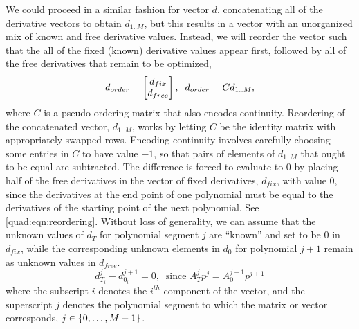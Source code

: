 We could proceed in a similar fashion for vector $d$, concatenating all of the derivative vectors to obtain $d_{1..M}$, but this results in a vector with an unorganized mix of known and free derivative values. Instead, we will reorder the vector such that the all of the fixed (known) derivative values appear first, followed by all of the free derivatives that remain to be optimized,
\begin{equation}
    d_{order} = \begin{bmatrix}
                    d_{fix} \\
                    d_{free}
                \end{bmatrix}
                , \hspace{2mm} d_{order} = Cd_{1..M},
\label{quad:eqn:ordering}
\end{equation}
where $C$ is a pseudo-ordering matrix that also encodes continuity. Reordering of the concatenated vector, $d_{1..M}$, works by letting $C$ be the identity matrix with appropriately swapped rows. Encoding continuity involves carefully choosing some entries in $C$ to have value $-1$, so that pairs of elements of $d_{1..M}$ that ought to be equal are subtracted. The difference is forced to evaluate to 0 by placing half of the free derivatives in the vector of fixed derivatives, $d_{fix}$, with value 0, since the derivatives at the end point of one polynomial must be equal to the derivatives of the starting point of the next polynomial. See \autoref{quad:eqn:reordering}. Without loss of generality, we can assume that the unknown values of $d_T$ for polynomial segment $j$ are ``known'' and set to be 0 in $d_{fix}$, while the corresponding unknown elements in $d_0$ for polynomial $j+1$ remain as unknown values in $d_{free}$.
\begin{equation}
     d_{T_i}^j - d_{0_i}^{j+1} = 0 ,\ \text{ since \ } A_T^j p^j = A_0^{j+1} p^{j+1}
\label{quad:eqn:reordering}
\end{equation}
where the subscript $i$ denotes the $i^{th}$ component of the vector, and the superscript $j$ denotes the polynomial segment to which the matrix or vector corresponds, $j \in \{ 0, \mathellipsis, M-1 \}$.

